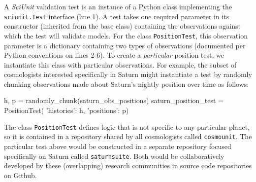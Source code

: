 \documentclass[9pt]{sig-alternate}
\newcommand{\verbx}[1]{\lstinline{#1}}
\begin{document}
A \textit{SciUnit} validation test is an {instance} of a Python class implementing the \verbx{sciunit.Test} interface (line 1). 
A test takes one required parameter in its constructor (inherited from the base class) containing the observations against which the test will validate models.
For the class \verbx{PositionTest}, this observation parameter is a dictionary containing two types of observations (documented per Python conventions on lines 2-6). 
To create a \emph{particular} position test, we instantiate this class with particular observations. 
For example, the subset of cosmologists interested specifically in Saturn might instantiate a test by randomly chunking observations made about Saturn's nightly position over time as follows:
\vspace{-3px}
\begin{python}
  h, p = randomly_chunk(saturn_obs_positions)
  saturn_position_test = PositionTest(
    {'histories': h, 'positions': p})
\end{python}
\vspace{-5px}
The class \verb|PositionTest| defines logic that is not specific to any particular planet, so it is contained in a repository shared by all cosmologists called \verbx{cosmounit}. The particular test above would be constructed in a separate repository focused specifically on Saturn called \verbx{saturnsuite}. Both would be collaboratively developed by these (overlapping) research communities in source code repositories on Github.
\end{document}
